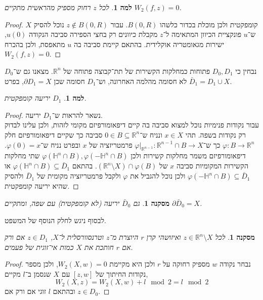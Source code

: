 \documentclass[aspectratio=169,notheorems,mathserif]{beamer}
\newcommand{\HH}[0]{\mathbb{H}}
\newcommand{\RR}[0]{\mathbb{R}}
\theoremstyle{c_plain}
\newtheorem{lemma}[theorem]{למה}
\theoremstyle{c_definition}
\theoremstyle{c_remark}
\newtheorem{corollary}[theorem]{מסקנה}
\begin{document}
\begin{frame}
	\begin{lemma}
		לכל $z$ רחוק מספיק מהראשית מתקיים $W_2(f, z) = 0$.
	\end{lemma}
	\begin{proof}
		$X$ קומפקטית ולכן מוכלת בכדור כלשהו $B(0, R)$.
		עבור $z \notin B(0, R)$ נוכל להסיק ש־$u$ פונקציית הכיוון המתאימה ל־$z$ מקבלת כיוונים רק בחצי הספירה סביבה הנקודה $u(0)$, ישירות מגאומטריה אוקלידית.
		בהתאם קיימת סביבה בה $u$ מתאפסת, ולכן בהכרח $W_2(f, z) = 0$.
	\end{proof}
	נבחין כי $D_0, D_1$ פתוחות כמחלקות הקשירות של תת־קבוצה פתוחה של $\RR^n$.
	מצאנו גם ש־$D_0$ לא חסומה מהלמה האחרונה, וש־$D_1$ חסומה שכן $\partial D_1 = X$, בפרט $\bar{D}_1 = D_1 \cup X$.
\end{frame}
\begin{frame}
	\begin{lemma}
		$D_1$ יריעה קומפקטית.
	\end{lemma}
	\begin{proof}
		נשאר להראות ש־$D_1$ יריעה. \\
		עבור נקודות פנימיות נוכל למצוא סביבה בה קיים דיפאומורפיזם מקומי לזהות, ולכן עלינו לבדוק רק נקודות בשפה.
		תהי $x \in X$ ונניח ש־$0 \in B \subseteq \RR^n$ סביבה כך שקיים דיפאומורפיזם חלק $\varphi : B \to \RR^n$ כך ש־$\varphi|_{\RR^{n - 1}} : \RR^{n - 1} \cap B \to X$ פרמטריזציה של $x$ ובפרט נניח ש־$\varphi(0) = x$.
		דיפאומורפיזם משמר מחלקות קשירות ולכן $\varphi(\HH^n \cap B), \varphi(-\HH^n \cap B)$ שתי מחלקות הקשירות המקומיות סביבה $x$ של $(\RR^n \setminus X) \cap \varphi(B)$.
		בהתאם $\varphi(\HH^n \cap B) \subseteq \bar{D}_1$ או $\varphi(-\HH^n \cap B) \subseteq \bar{D}_1$ ולכן נוכל להגביל את $\varphi$ ולקבל פרמטריזציה מקומית של $\bar{D}_1$ ולהסיק שהיא יריעה קומפקטית.
	\end{proof}
\end{frame}
\begin{frame}
	\begin{corollary}
		גם $\bar{D}_0$ יריעה (לא קומפקטית) עם שפה, ומתקיים $\partial \bar{D}_0 = X$.
	\end{corollary}
	לבסוף ניגש לחלק הנוסף של המשפט.
	\begin{corollary}
		לכל $z \in \RR^n \setminus X$ ואיזושהי קרן $r$ היוצרת מ־$z$ וטרנסוורסלית ל־$X$, $z \in D_1$ אם ורק אם $r$ חותכת את $X$ כמות אי־זוגית של פעמים.
	\end{corollary}
	\begin{proof}
		נבחר נקודה $w$ מספיק רחוקה על $r$ ולכן היא מקיימת $W_2(X, w) = 0$, ולכן מספר נקודות החיתוך של $[z, w]$ עם $X$ שנסמן ב־$l$ מקיים,
		\[
			W_2(X, z)
			= W_2(X, w) + l \mod 2
			= l \mod 2
		\]
		ובהתאם $l$ זוגי אם ורק אם $z \in D_0$.
	\end{proof}
\end{frame}
\end{document}
